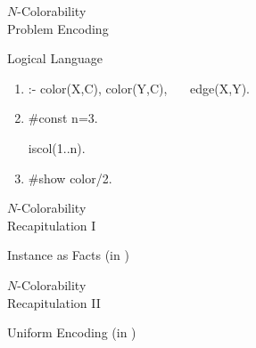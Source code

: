 \begin{frame}{$N$-Colorability\\
              \normalsize {} Problem \alert{Encoding}}
\begin{minipage}[t]{0.47\linewidth}
\begin{block}{Logical Language}
\begin{enumerate}
{{\begin{semiverbatim}
{          \ \ \ \ \ \ \ \ \ \ \ \ iscol(C) \}\ 1

          \ \ \ \ \ \ \ \ :- node(X).}
\end{semiverbatim}}
\begin{semiverbatim}

\end{semiverbatim}}
\vspace{-1mm}
  \item<4->\small
\begin{semiverbatim}
\alert<4>{:- color(X,C), color(Y,C),}
\alert<4>{\ \ \ edge(X,Y).}
\end{semiverbatim}
\vspace{1mm}
  \item<5->\small
\begin{semiverbatim}
\#const \alert<5>{n=3}.

\alert<5>{iscol(1..n).}
\end{semiverbatim}
  \item<6->\small
\begin{semiverbatim}
\alert<6>{\#show color/2.}
\end{semiverbatim}
  \end{enumerate}
\end{block}
\end{minipage}
\end{frame}
\begin{frame}{$N$-Colorability\\
              \normalsize Recapitulation I\phantom{I}}
\begin{block}{Instance as Facts (in )}

\end{block}
\end{frame}
\begin{frame}{$N$-Colorability\\
              \normalsize Recapitulation II}
\begin{block}{Uniform Encoding (in )}

\end{block}
\end{frame}

